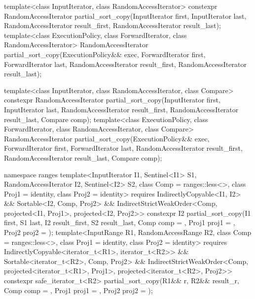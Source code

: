 %
\begin{itemdecl}
template<class InputIterator, class RandomAccessIterator>
  constexpr RandomAccessIterator
    partial_sort_copy(InputIterator first, InputIterator last,
                      RandomAccessIterator result_first,
                      RandomAccessIterator result_last);
template<class ExecutionPolicy, class ForwardIterator, class RandomAccessIterator>
  RandomAccessIterator
    partial_sort_copy(ExecutionPolicy&& exec,
                      ForwardIterator first, ForwardIterator last,
                      RandomAccessIterator result_first,
                      RandomAccessIterator result_last);

template<class InputIterator, class RandomAccessIterator,
         class Compare>
  constexpr RandomAccessIterator
    partial_sort_copy(InputIterator first, InputIterator last,
                      RandomAccessIterator result_first,
                      RandomAccessIterator result_last,
                      Compare comp);
template<class ExecutionPolicy, class ForwardIterator, class RandomAccessIterator,
         class Compare>
  RandomAccessIterator
    partial_sort_copy(ExecutionPolicy&& exec,
                      ForwardIterator first, ForwardIterator last,
                      RandomAccessIterator result_first,
                      RandomAccessIterator result_last,
                      Compare comp);

namespace ranges {
  template<InputIterator I1, Sentinel<I1> S1, RandomAccessIterator I2, Sentinel<I2> S2,
      class Comp = ranges::less<>, class Proj1 = identity, class Proj2 = identity>
    requires IndirectlyCopyable<I1, I2> && Sortable<I2, Comp, Proj2> &&
        IndirectStrictWeakOrder<Comp, projected<I1, Proj1>, projected<I2, Proj2>>
    constexpr I2
      partial_sort_copy(I1 first, S1 last, I2 result_first, S2 result_last,
                        Comp comp = {}, Proj1 proj1 = {}, Proj2 proj2 = {});
  template<InputRange R1, RandomAccessRange R2, class Comp = ranges::less<>,
      class Proj1 = identity, class Proj2 = identity>
    requires IndirectlyCopyable<iterator_t<R1>, iterator_t<R2>> &&
        Sortable<iterator_t<R2>, Comp, Proj2> &&
        IndirectStrictWeakOrder<Comp, projected<iterator_t<R1>, Proj1>,
          projected<iterator_t<R2>, Proj2>>
    constexpr safe_iterator_t<R2>
      partial_sort_copy(R1&& r, R2&& result_r, Comp comp = {},
                        Proj1 proj1 = {}, Proj2 proj2 = {});
}
\end{itemdecl}

